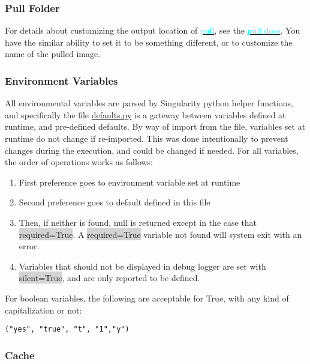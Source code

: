 \documentclass[a4paper]{article}
\begin{document}
\subsubsection{Pull Folder}

For details about customizing the output location of 
\hyperref[sec:pull]{{\textcolor{cyan}{pull}}}, see the 
\hyperref[sec:pull]{{\textcolor{cyan}{pull docs}}}. You have the similar ability to set it to be something different, or to customize the name of the pulled image.


\subsubsection{Environment Variables}

All environmental variables are parsed by Singularity python helper functions, and specifically the file \href{https://github.com/singularityware/singularity/blob/master/libexec/python/defaults.py}{defaults.py} is a gateway between variables defined at runtime, and pre-defined defaults. By way of import from the file, variables set at runtime do not change if re-imported. This was done intentionally to prevent changes during the execution, and could be changed if needed. For all variables, the order of operations works as follows:\\
\begin{enumerate}
\item First preference goes to environment variable set at runtime
\item Second preference goes to default defined in this file
\item Then, if neither is found, null is returned except in the case that \colorbox{lightgray}{required=True}. A \colorbox{lightgray}{required=True} variable not found will system exit with an error.
\item Variables that should not be displayed in debug logger are set with \colorbox{lightgray}{silent=True}, and are only reported to be defined.
\end{enumerate}

For boolean variables, the following are acceptable for True, with any kind of capitalization or not:

\begin{lstlisting}[frame=single]
("yes", "true", "t", "1","y")
\end{lstlisting}

\subsubsection{Cache}
\end{document}
